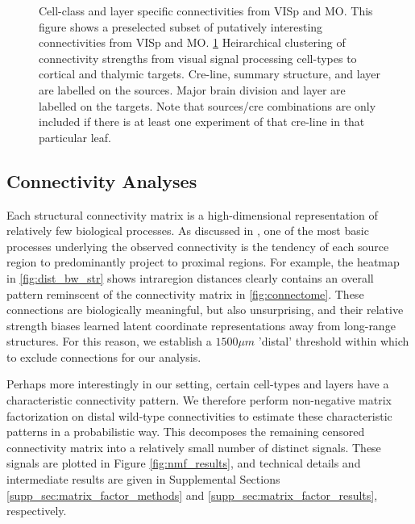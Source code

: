 \begin{figure}[H]
    \newline
    
    \caption{ Cell-class and layer specific connectivities from VISp and MO.
    		This figure shows a preselected subset of putatively interesting connectivities from VISp and MO.
    		\ref{fig:data_ct}
		Heirarchical clustering of connectivity strengths from visual signal processing cell-types to cortical and thalymic targets.
		Cre-line, summary structure, and layer are labelled on the sources.
		Major brain division and layer are labelled on the targets.
		Note that sources/cre combinations are only included if there is at least one experiment of that cre-line in that particular leaf.}
\label{fig:data_ct}
\end{figure}

\newpage

\subsection{Connectivity Analyses}

Each structural connectivity matrix is a high-dimensional representation of relatively few biological processes.
As discussed in \citet{Knox2019-ot}, one of the most basic processes underlying the observed connectivity is the tendency of each source region to predominantly project to proximal regions.
For example, the heatmap in \ref{fig:dist_bw_str} shows intraregion distances clearly contains an overall pattern reminscent of the connectivity matrix in \ref{fig:connectome}.
These connections are biologically meaningful, but also unsurprising, and their relative strength biases learned latent coordinate representations away from long-range structures.
For this reason, we establish a $1500 \mu m$ 'distal' threshold within which to exclude connections for our analysis.

Perhaps more interestingly in our setting, certain cell-types and layers have a characteristic connectivity pattern.
We therefore perform non-negative matrix factorization on distal wild-type connectivities to estimate these characteristic patterns in a probabilistic way.
This decomposes the remaining censored connectivity matrix into a relatively small number of distinct signals.
These signals are plotted in Figure \ref{fig:nmf_results}, and technical details and intermediate results are given in Supplemental Sections \ref{supp_sec:matrix_factor_methods} and \ref{supp_sec:matrix_factor_results}, respectively.

